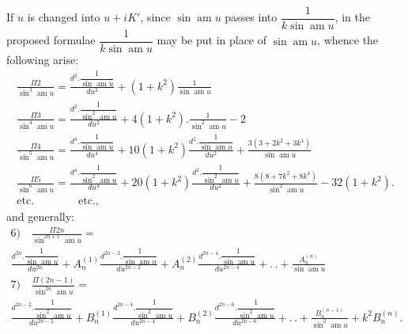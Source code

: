\documentclass{article}
\begin{document}
If $u$ is changed into $u+iK'$, since $\sin\operatorname{am}u$ passes into $\dfrac{1}{k\sin\operatorname{am}u}$, in the proposed formulae $\dfrac{1}{k\sin\operatorname{am}u}$ may be put in place of $\sin\operatorname{am}u$, whence the following arise:
\[
\begin{gathered}
\frac{\Pi 2}{\sin^{3}\operatorname{am}u}=\frac{d^{2}.\dfrac{1}{\sin\operatorname{am}u}}{du^{2}}+(1+k^{2})\frac{1}{\sin\operatorname{am}u}\\[1.5ex]
\frac{\Pi 3}{\sin^{4}\operatorname{am}u}=\frac{d^{2}.\dfrac{1}{\sin^{2}\operatorname{am}u}}{du^{2}}+4(1+k^{2}).\frac{1}{\sin^{2}\operatorname{am}u}-2\\[1.5ex]
\frac{\Pi 4}{\sin^{5}\operatorname{am}u}=\frac{d^{4}.\dfrac{1}{\sin\operatorname{am}u}}{du^{4}}+10(1+k^{2})\frac{d^{2}.\dfrac{1}{\sin\operatorname{am}u}}{du^{2}}+\frac{3(3+2k^{2}+3k^{4})}{\sin\operatorname{am}u}\\[1.5ex]
\frac{\Pi 5}{\sin^{6}\operatorname{am}u}=\frac{d^{4}.\dfrac{1}{\sin^{2}\operatorname{am}u}}{du^{4}}+20(1+k^{2})\frac{d^{2}.\dfrac{1}{\sin^{2}\operatorname{am}u}}{du^{2}}+\frac{8(8+7k^{2}+8k^{4})}{\sin^{2}\operatorname{am}u}-32(1+k^{2}).\\[1.5ex]
\text{etc.}\qquad\qquad\text{etc.},
\end{gathered}
\]
and generally:
\[
\begin{gathered}
\text{6)}\quad\frac{\Pi 2n}{\sin^{2n+1}\operatorname{am}u}=\\[1.5ex]
\frac{d^{2n}.\dfrac{1}{\sin\operatorname{am}u}}{du^{2n}}+A_{n}^{(1)}\frac{d^{2n-2}.\dfrac{1}{\sin\operatorname{am}u}}{du^{2n-2}}+A_{n}^{(2)}\frac{d^{2n-4}.\dfrac{1}{\sin\operatorname{am}u}}{du^{2n-4}}+.\,.+\frac{A_{n}^{(n)}}{\sin\operatorname{am}u}\\[1.5ex]
\text{7)}\quad\frac{\Pi(2n-1)}{\sin^{2n}\operatorname{am}u}=\\[1.5ex]
\frac{d^{2n-2}.\dfrac{1}{\sin^{2}\operatorname{am}u}}{du^{2n-2}}+B_{n}^{(1)}\frac{d^{2n-4}.\dfrac{1}{\sin^{2}\operatorname{am}u}}{du^{2n-4}}+B_{n}^{(2)}\frac{d^{2n-6}.\dfrac{1}{\sin^{2}\operatorname{am}u}}{du^{2n-6}}+.\,.+\frac{B_{n}^{(n-1)}}{\sin^{2}\operatorname{am}u}+k^{2}B_{n}^{(n)}.
\end{gathered}
\]
\end{document}
